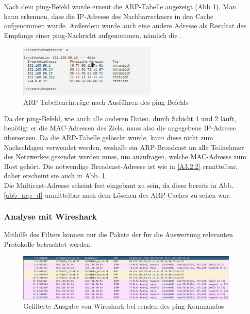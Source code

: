 Nach dem ping-Befehl wurde erneut die ARP-Tabelle angezeigt (Abb \ref{abb_arp_neu}). Man kann erkennen, dass die IP-Adresse des Nachbarrechners in den Cache aufgenommen wurde. Außerdem wurde auch eine andere Adresse als Resultat des Empfangs einer ping-Nachricht aufgenommen, nämlich die .

\begin{figure}[H]
  \begin{center}
\includegraphics[width=0.618\textwidth]{graphics/versuch/3_3/arp_a_nach_ping_von_nachbar}
    \caption{ARP-Tabelleneinträge nach Ausführen des ping-Befehls}\label{abb_arp_neu}
  \end{center}
\end{figure}

Da der ping-Befehl, wie auch alle anderen Daten, durch Schicht 1 und 2 läuft, benötigt er die MAC-Adressen des Ziels, muss also die angegebene IP-Adresse übersetzen. Da die ARP-Tabelle gelöscht wurde, kann diese nicht zum Nachschlagen verwendet werden, weshalb ein ARP-Broadcast an alle Teilnehmer des Netzwerkes gesendet werden muss, um anzufragen, welche MAC-Adresse zum Host  gehört. Die notwendige Broadcast-Adresse ist wie in \ref{A3.2.2} ermittelbar, daher erscheint sie auch in Abb. \ref{abb_arp_neu}.\\

Die Multicast-Adresse  scheint fest eingebaut zu sein, da diese bereits in Abb. \ref{abb_arp_d} unmittelbar nach dem Löschen des ARP-Caches zu sehen war.

\subsubsection{Analyse mit Wireshark}
Mithilfe des Filters  können nur die Pakete der für die Auswertung relevanten Protokolle betrachtet werden.\\


\begin{figure}[H]
  \begin{center}
\includegraphics[width=\textwidth]{graphics/versuch/3_3/wireshark/allgemein}
    \caption{Gefilterte Ausgabe von Wireshark bei senden des ping-Kommandos}\label{wire_ping}
  \end{center}
\end{figure}

